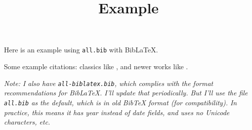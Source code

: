 \documentclass{article}
\title{Example}\author{}\date{}
\begin{document}
\maketitle

Here is an example using \texttt{all.bib} with Bib\LaTeX{}.

Some example citations: classics like \citet{chomsky.n:1957, kolmogorov.a:1968,
tesniere.l:1959, estes.w:1959}, and newer works like \citet{lew.a:2022RAVI,
tay.y:2022}.

\emph{Note: I also have \emph{\texttt{all-biblatex.bib}}, which complies with
  the format recommendations for Bib\LaTeX. I'll update that periodically.
  But I'll use the file \emph{\texttt{all.bib}} as the default,
  which is in old Bib\TeX{} format (for compatibility).
  In practice, this means it has \emph{year} instead of \emph{date} fields, and
  uses no Unicode characters, etc.}

\printbibliography
\end{document}
